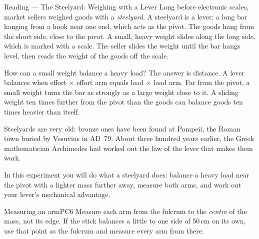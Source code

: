 
\begin{readingbox}{Reading --- The Steelyard: Weighing with a Lever}
Long before electronic scales, market sellers weighed goods with a \emph{steelyard}. A steelyard is a lever: a long bar hanging from a hook near one end, which acts as the pivot. The goods hang from the short side, close to the pivot. A small, heavy weight slides along the long side, which is marked with a scale. The seller slides the weight until the bar hangs level, then reads the weight of the goods off the scale.

How can a small weight balance a heavy load? The answer is distance. A lever balances when effort $\times$ effort arm equals load $\times$ load arm. Far from the pivot, a small weight turns the bar as strongly as a large weight close to it. A sliding weight ten times further from the pivot than the goods can balance goods ten times heavier than itself.

Steelyards are very old: bronze ones have been found at Pompeii, the Roman town buried by Vesuvius in AD~79. About three hundred years earlier, the Greek mathematician Archimedes had worked out the law of the lever that makes them work.

In this experiment you will do what a steelyard does: balance a heavy load near the pivot with a lighter mass further away, measure both arms, and work out your lever's mechanical advantage.
\end{readingbox}

\rcreset
{}


\begin{technique}{Measuring an arm}{PC6}
Measure each arm from the fulcrum to the \emph{centre} of the mass, not its edge. If the stick balances a little to one side of 50\,cm on its own, use that point as the fulcrum and measure every arm from there.
\end{technique}

